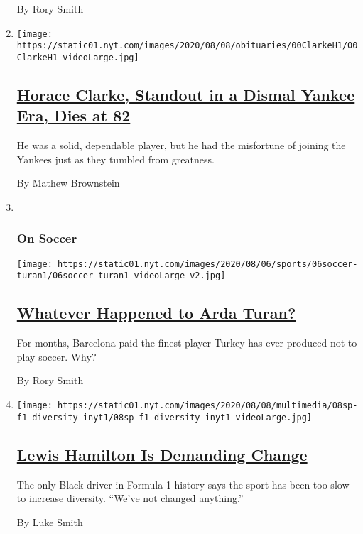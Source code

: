 \begin{enumerate}
  By Rory Smith
\item
  \texttt{[image: https://static01.nyt.com/images/2020/08/08/obituaries/00ClarkeH1/00ClarkeH1-videoLarge.jpg]}

  \hypertarget{horace-clarke-standout-in-a-dismal-yankee-era-dies-at-82}{%
  \subsection{\texorpdfstring{\href{/2020/08/07/sports/baseball/horace-clarke-dead.html}{Horace
  Clarke, Standout in a Dismal Yankee Era, Dies at
  82}}{Horace Clarke, Standout in a Dismal Yankee Era, Dies at 82}}\label{horace-clarke-standout-in-a-dismal-yankee-era-dies-at-82}}

  He was a solid, dependable player, but he had the misfortune of
  joining the Yankees just as they tumbled from greatness.

  By Mathew Brownstein
\item ~
  \hypertarget{on-soccer}{%
  \subsubsection{On Soccer}\label{on-soccer}}

  \texttt{[image: https://static01.nyt.com/images/2020/08/06/sports/06soccer-turan1/06soccer-turan1-videoLarge-v2.jpg]}

  \hypertarget{whatever-happened-to-arda-turan}{%
  \subsection{\texorpdfstring{\href{/2020/08/06/sports/soccer/arda-turan-galatasaray-barcelona.html}{Whatever
  Happened to Arda
  Turan?}}{Whatever Happened to Arda Turan?}}\label{whatever-happened-to-arda-turan}}

  For months, Barcelona paid the finest player Turkey has ever produced
  not to play soccer. Why?

  By Rory Smith
\item
  \texttt{[image: https://static01.nyt.com/images/2020/08/08/multimedia/08sp-f1-diversity-inyt1/08sp-f1-diversity-inyt1-videoLarge.jpg]}

  \hypertarget{lewis-hamilton-is-demanding-change}{%
  \subsection{\texorpdfstring{\href{/2020/08/07/sports/autoracing/lewis-hamilton-formula-1-diversity.html}{Lewis
  Hamilton Is Demanding
  Change}}{Lewis Hamilton Is Demanding Change}}\label{lewis-hamilton-is-demanding-change}}

  The only Black driver in Formula 1 history says the sport has been too
  slow to increase diversity. ``We've not changed anything.''

  By Luke Smith
\end{enumerate}


